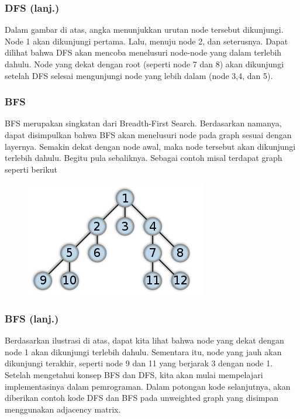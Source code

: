 \begin{frame}
\frametitle{DFS (lanj.)}
Dalam gambar di atas, angka menunjukkan urutan node tersebut dikunjungi. Node 1 akan dikunjungi pertama. Lalu, menuju node 2, dan seterusnya. Dapat dilihat bahwa DFS akan mencoba menelusuri node-node yang dalam terlebih dahulu.
\newline\newline
Node yang dekat dengan root (seperti node 7 dan 8) akan dikunjungi setelah DFS selesai mengunjungi node yang lebih dalam (node 3,4, dan 5).
\end{frame}

\begin{frame}
\frametitle{BFS}

\alert{BFS} merupakan singkatan dari Breadth-First Search. Berdasarkan namanya, dapat disimpulkan bahwa BFS akan menelusuri node pada graph sesuai dengan layernya. Semakin dekat dengan node awal, maka node tersebut akan dikunjungi terlebih dahulu. Begitu pula sebaliknya. Sebagai contoh misal terdapat graph seperti berikut

\begin{figure}
	\centering
	\includegraphics[width=6 cm]{asset/bfs.png}
\end{figure}

\end{frame}

\begin{frame}
\frametitle{BFS (lanj.)}

Berdasarkan ilustrasi di atas, dapat kita lihat bahwa node yang dekat dengan node 1 akan dikunjungi terlebih dahulu. Sementara itu, node yang jauh akan dikunjungi terakhir, seperti node 9 dan 11 yang berjarak 3 dengan node 1.
\newline\newline
Setelah mengetahui konsep BFS dan DFS, kita akan mulai mempelajari implementasinya dalam pemrograman. Dalam potongan kode selanjutnya, akan diberikan contoh kode DFS dan BFS pada unweighted graph yang disimpan menggunakan adjacency matrix.
\end{frame}

